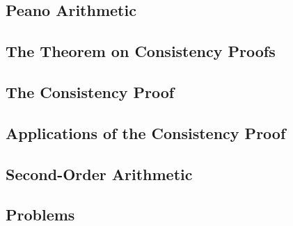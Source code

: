 \subsection{Peano Arithmetic}


\subsection{The Theorem on Consistency Proofs}


\subsection{The Consistency Proof}


\subsection{Applications of the Consistency Proof}


\subsection{Second-Order Arithmetic}


\subsection{Problems}

